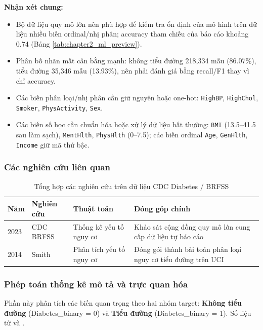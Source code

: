 \textbf{Nhận xét chung:}
\begin{itemize}
 \item Bộ dữ liệu quy mô lớn nên phù hợp để kiểm tra ổn định của mô hình trên dữ liệu nhiều biến ordinal/nhị phân; accuracy tham chiếu của báo cáo khoảng 0.74 (Bảng \ref{tab:chapter2_ml_preview}).
 \item Phân bố nhãn mất cân bằng mạnh: không tiểu đường 218,334 mẫu (86.07\%), tiểu đường 35,346 mẫu (13.93\%), nên phải đánh giá bằng recall/F1 thay vì chỉ accuracy.
 \item Các biến phân loại/nhị phân cần giữ nguyên hoặc one-hot: \texttt{HighBP}, \texttt{HighChol}, \texttt{Smoker}, \texttt{PhysActivity}, \texttt{Sex}.
 \item Các biến số học cần chuẩn hóa hoặc xử lý dữ liệu bất thường: \texttt{BMI} (13.5--41.5 sau làm sạch), \texttt{MentHlth}, \texttt{PhysHlth} (0--7.5); các biến ordinal \texttt{Age}, \texttt{GenHlth}, \texttt{Income} giữ mã thứ bậc.
\end{itemize}

\subsubsection{Các nghiên cứu liên quan}

\begin{table}[H]
\centering
\caption{Tổng hợp các nghiên cứu trên dữ liệu CDC Diabetes / BRFSS}
\label{tab:cdc_research_review}
\small
\begin{tabular}{p{}p{}p{}p{}}
\toprule
Năm & Nghiên cứu & Thuật toán & Đóng góp chính \\
\midrule
2023 & CDC BRFSS \cite{CDC2023BRFSS} & Thống kê yếu tố nguy cơ & Khảo sát cộng đồng quy mô lớn cung cấp dữ liệu tự báo cáo \\
2014 & Smith \cite{Smith2014CDCIndicators} & Phân tích yếu tố nguy cơ & Đóng gói thành bài toán phân loại nguy cơ tiểu đường trên UCI \\
\bottomrule
\end{tabular}
\end{table}

\subsubsection{Phép toán thống kê mô tả và trực quan hóa}

Phần này phân tích các biến quan trọng theo hai nhóm target: \textbf{Không tiểu đường} (Diabetes\_binary = 0) và \textbf{Tiểu đường} (Diabetes\_binary = 1). Số liệu từ  và .

